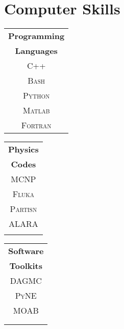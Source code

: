 %
%
\section{Computer Skills}
\begin{minipage}{\textwidth}
	\begin{center}
\begin{minipage}{0.20\textwidth}
	\begin{center}
		\begin{tabular}{c}
			{\large\textbf{Programming}}\\
			{\large\textbf{Languages}}\\ [2mm]
               \textsc{C++} \\
               \textsc{Bash} \\
               \textsc{Python} \\
               \textsc{Matlab} \\
               \textsc{Fortran} \\
		\end{tabular}
	\end{center}
\end{minipage}%
	\begin{minipage}{0.15\textwidth}
		\begin{tabular}{c}
			{\large\textbf{Physics}}\\
			{\large\textbf{Codes}}\\[2mm]
			\textsc{MCNP} \\
			\textsc{Fluka} \\
			\textsc{Partisn} \\
			\textsc{ALARA} \\
			\textsc{} \\
		\end{tabular}
\end{minipage}%
\begin{minipage}{0.15\textwidth}
	\begin{tabular}{c}
		{\large\textbf{Software}}\\
		{\large\textbf{Toolkits}}\\[2mm]
               \textsc{DAGMC} \\
               \textsc{PyNE} \\
               \textsc{MOAB} \\
               \textsc{} \\
               \textsc{} \\
	\end{tabular}

\end{minipage}
\end{center}
\end{minipage}
